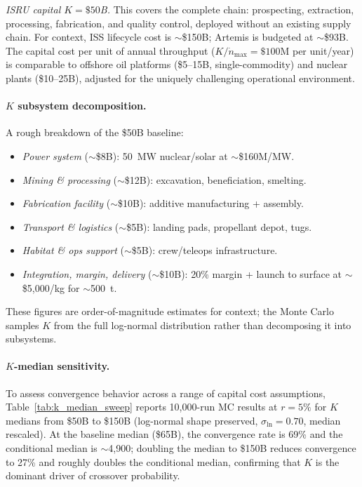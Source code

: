 \documentclass[preprint,12pt]{elsarticle}
\begin{document}
\emph{ISRU capital $K = \$50$B.} This covers the complete chain: prospecting, extraction, processing, fabrication, and quality control, deployed without an existing supply chain. For context, ISS lifecycle cost is $\sim$\$150B; Artemis is budgeted at $\sim$\$93B. The capital cost per unit of annual throughput ($K/\dot{n}_{\max} = \$100$M per unit/year) is comparable to offshore oil platforms (\$5--15B, single-commodity) and nuclear plants (\$10--25B), adjusted for the uniquely challenging operational environment.

\paragraph{$K$ subsystem decomposition.} A rough breakdown of the \$50B baseline:
\begin{itemize}
  \item \emph{Power system} (${\sim}$\$8B): 50~MW nuclear/solar at ${\sim}$\$160M/MW.
  \item \emph{Mining \& processing} (${\sim}$\$12B): excavation, beneficiation, smelting.
  \item \emph{Fabrication facility} (${\sim}$\$10B): additive manufacturing + assembly.
  \item \emph{Transport \& logistics} (${\sim}$\$5B): landing pads, propellant depot, tugs.
  \item \emph{Habitat \& ops support} (${\sim}$\$5B): crew/teleops infrastructure.
  \item \emph{Integration, margin, delivery} (${\sim}$\$10B): 20\% margin + launch to surface at ${\sim}$\$5{,}000/kg for ${\sim}$500~t.
\end{itemize}
These figures are order-of-magnitude estimates for context; the Monte Carlo samples $K$ from the full log-normal distribution rather than decomposing it into subsystems.

\paragraph{$K$-median sensitivity.} To assess convergence behavior across a range of capital cost assumptions, Table~\ref{tab:k_median_sweep} reports 10{,}000-run MC results at $r = 5\%$ for $K$ medians from \$50B to \$150B (log-normal shape preserved, $\sigma_{\ln} = 0.70$, median rescaled). At the baseline median (\$65B), the convergence rate is 69\% and the conditional median is $\sim$4{,}900; doubling the median to \$150B reduces convergence to 27\% and roughly doubles the conditional median, confirming that $K$ is the dominant driver of crossover probability.
\end{document}
